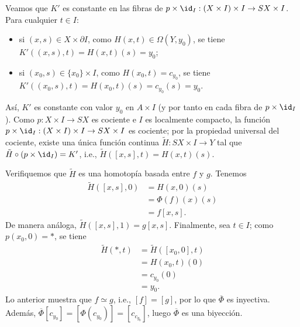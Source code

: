 \begin{demostracion}
Veamos que $K'$ es constante en las fibras de $p\times \id_I:(X\times I)\times I\to SX\times I$. Para cualquier $t\in I$:
\begin{itemize}
    \item si $(x,s)\in X\times \partial I$, como $H(x,t)\in \Omega(Y,y_0)$, se tiene $K'((x,s),t)=H(x,t)(s)=y_0$;
    \item si $(x_0,s)\in \{x_0\}\times I$, como $H(x_0,t)=c_{y_0}$, se tiene $K'((x_0,s),t)=H(x_0,t)(s)=c_{y_0}(s)=y_0$.
\end{itemize}
Así, $K'$ es constante con valor $y_0$ en $A\times I$ (y por tanto en cada fibra de $p\times \id_I$). Como $p:X\times I\to SX$ es cociente e $I$ es localmente compacto, la función $p\times \id_I:(X\times I)\times I\to SX\times I$ es cociente; por la propiedad universal del cociente, existe una única función continua $\tilde{H}:SX\times I\to Y$ tal que $\tilde{H}\circ (p\times \id_I)=K'$, i.e., $\tilde{H}([x,s],t)=H(x,t)(s)$.

Verifiquemos que $\tilde{H}$ es una homotopía basada entre $f$ y $g$. Tenemos
\begin{align*}
    \tilde{H}([x,s],0)&=H(x,0)(s)\\
    &=\Phi(f)(x)(s)\\
    &=f[x,s].
\end{align*}
De manera análoga, $\tilde{H}([x,s],1)=g[x,s]$. Finalmente, sea $t\in I$; como $p(x_0,0)=*$, se tiene
\begin{align*}
    \tilde{H}(*,t)&=\tilde{H}([x_0,0],t)\\
    &=H(x_0,t)(0)\\
    &=c_{y_0}(0)\\
    &=y_0.
\end{align*}
Lo anterior muestra que $f\simeq g$, i.e., $[f]=[g]$, por lo que $\overline{\Phi}$ es inyectiva. Además, $\overline{\Phi}[c_{y_0}]=[\Phi(c_{y_0})]=[c_{c_{y_0}}]$, luego $\overline{\Phi}$ es una biyección.
\end{demostracion}
